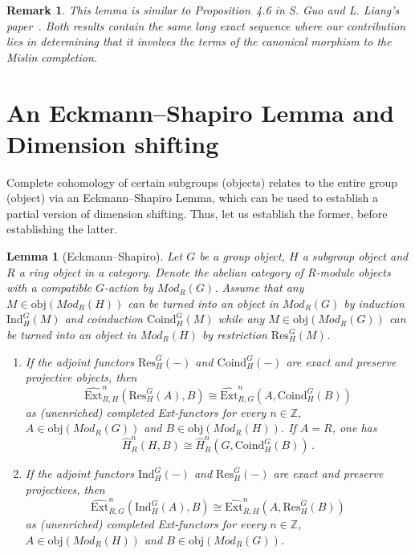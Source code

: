 \documentclass[12pt, a4paper]{article}
\numberwithin{equation}{section}
\newtheorem{lem}[thm]{Lemma}
\newtheorem{rem}[thm]{Remark}
\theoremstyle{empty}
\theoremstyle{nonumberplain}
\begin{document}
\begin{rem}
This lemma is similar to Proposition~4.6 in S.\! Guo and L.\! Liang's paper~\cite{guo23}. Both results contain the same long exact sequence where our contribution lies in determining that it involves the terms of the canonical morphism to the Mislin completion.
\end{rem}

\section{An Eckmann--Shapiro Lemma and Dimension shifting}\label{sec:dimshifteckmannshapiro}

Complete cohomology of certain subgroups (objects) relates to the entire group (object) via an Eckmann--Shapiro Lemma, which can be used to establish a partial version of dimension shifting. Thus, let us establish the former, before establishing the latter.

\begin{lem}[Eckmann--Shapiro]\label{lem:eckmannshapiro}
Let $G$ be a group object, $H$ a subgroup object and $R$ a ring object in a category. Denote the abelian category of $R$-module objects with a compatible $G$-action by $Mod_R(G)$. Assume that any $M \in \mathrm{obj}(Mod_R(H))$ can be turned into an object in $Mod_R(G)$ by induction $\mathrm{Ind}_H^G(M)$ and coinduction $\mathrm{Coind}_H^G(M)$ while any $M \in \mathrm{obj}(Mod_R(G))$ can be turned into an object in $Mod_R(H)$ by restriction $\mathrm{Res}_H^G(M)$.
\begin{enumerate}
\item If the adjoint functors $\mathrm{Res}_H^G(-)$ and $\mathrm{Coind}_H^G(-)$ are exact and preserve projective objects, then
\[ \widehat{\mathrm{Ext}}_{R, H}^n(\mathrm{Res}_H^G(A), B) \cong \widehat{\mathrm{Ext}}_{R, G}^n(A, \mathrm{Coind}_H^G(B)) \]
as (unenriched) completed Ext-functors for every $n \in \mathbb{Z}$, $A \in \mathrm{obj}(Mod_R(G))$ and $B \in \mathrm{obj}(Mod_R(H))$. If $A = R$, one has
\[ \widehat{H}_R^n(H, B) \cong \widehat{H}_R^n(G, \mathrm{Coind}_H^G(B)) \, . \]
\item If the adjoint functors $\mathrm{Ind}_H^G(-)$ and $\mathrm{Res}_H^G(-)$ are exact and preserve projectives, then
\[ \widehat{\mathrm{Ext}}_{R, G}^n(\mathrm{Ind}_H^G(A), B) \cong \widehat{\mathrm{Ext}}_{R, H}^n(A, \mathrm{Res}_H^G(B)) \]
as (unenriched) completed Ext-functors for every $n \in \mathbb{Z}$, $A \in \mathrm{obj}(Mod_R(H))$ and $B \in \mathrm{obj}(Mod_R(G))$.
\end{enumerate}
\end{lem}
\end{document}
